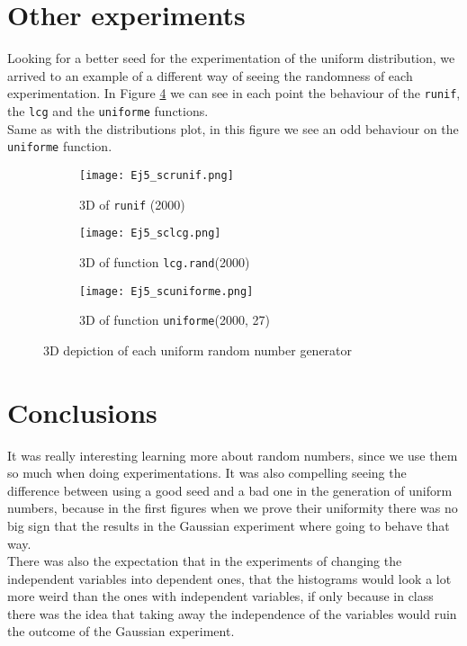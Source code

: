 \documentclass{article}
\begin{document}
\clearpage

\section{Other experiments}

Looking for a better seed for the experimentation of the uniform distribution, we arrived to an example of a different way of seeing the randomness of each experimentation. In Figure \ref{extra} we can see in each point the behaviour of the \texttt{runif}, the \texttt{lcg} and the \texttt{uniforme} functions.\\

Same as with the distributions plot, in this figure we see an odd behaviour on the \texttt{uniforme} function.\\


\begin{figure}[]
\begin{subfigure}{.5\textwidth}
  \centering
  \texttt{[image: Ej5\_scrunif.png]}  
  \caption{3D of \texttt{runif} (2000) }
  \label{extra1}
\end{subfigure}
\begin{subfigure}{.5\textwidth}
  \centering
  \texttt{[image: Ej5\_sclcg.png]}  
  \caption{3D of function \texttt{lcg.rand}(2000)}
  \label{extra2}
\end{subfigure}
\newline
\begin{subfigure}{.5\textwidth}
  \centering
  \texttt{[image: Ej5\_scuniforme.png]}  
  \caption{3D of function \texttt{uniforme}(2000, 27)}
  \label{extra3}
\end{subfigure}
\caption{3D depiction of each uniform random number generator}
\label{extra}
\end{figure}


\section{Conclusions}

It was really interesting learning more about random numbers, since we use them so much when doing experimentations. It was also compelling seeing the difference between using a good seed and a bad one in the generation of uniform numbers, because in the first figures when we prove their uniformity there was no big sign that the results in the Gaussian experiment where going to behave that way. \\

There was also the expectation that in the experiments of changing the independent variables into dependent ones, that the histograms would look a lot more weird than the ones with independent variables, if only because in class there was the idea that taking away the independence of the variables would ruin the outcome of the Gaussian experiment.\\




 
\end{document}
